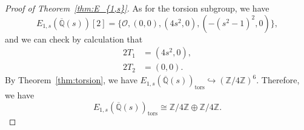 \documentclass[main]{subfiles}
\begin{document}
\begin{proof}[Proof of Theorem~\ref{thm:E_{1,s}}]
    As for the torsion subgroup, we have
    \begin{equation*}
        E_{1,s}(\overline{\mathbb{Q}}(s))[2] = \{\mathcal{O}, (0,0), (4s^{2},0),( - (s^{2} - 1)^{2},0)\},
    \end{equation*}
    and we can check by calculation that
    \begin{align}
        2T_1 & = (4s^2,0), \\
        2T_2 & = (0,0).
    \end{align}
    By Theorem~\ref{thm:torsion}, we have $E_{1,s}(\overline{\mathbb{Q}}(s))_ \text{tors} \hookrightarrow (\mathbb{Z} / 4 \mathbb{Z})^{6}$.
    Therefore, we have
    \begin{equation*}
        E_{1,s}(\overline{\mathbb{Q}}(s))_ \text{tors} \cong \mathbb{Z} / 4 \mathbb{Z} \oplus \mathbb{Z} / 4 \mathbb{Z}.
    \end{equation*}
\end{proof}
\end{document}
